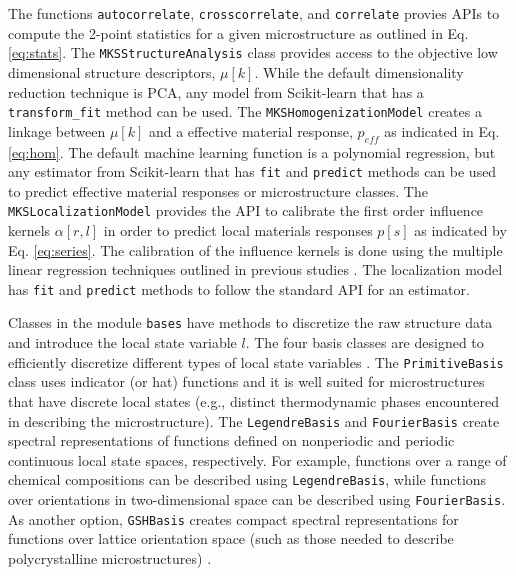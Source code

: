 \documentclass{bmcart}
\begin{document}
The functions \texttt{autocorrelate}, \texttt{crosscorrelate}, and \texttt{correlate} provies APIs to compute the 2-point statistics for a given microstructure as outlined in Eq. \ref{eq:stats}. The \texttt{MKSStructureAnalysis} class provides access to the objective low dimensional structure descriptors, $\mu[k]$. While the default dimensionality reduction technique is PCA, any model from Scikit-learn that has a \texttt{transform\_fit} method can be used. The \texttt{MKSHomogenizationModel} creates a linkage between $\mu[k]$ and a effective material response, $p_{eff}$ as indicated in Eq. \ref{eq:hom}. The default machine learning function is a polynomial regression, but any estimator from Scikit-learn that has \texttt{fit} and \texttt{predict} methods can be used to predict effective material responses or microstructure classes. The \texttt{MKSLocalizationModel} provides the API to calibrate the first order influence kernels $\alpha[r, l]$ in order to predict local materials responses $p[s]$ as indicated by Eq. \ref{eq:series}. The calibration of the influence kernels is done using the multiple linear regression techniques outlined in previous studies \cite{landi2010multi, kalidindi2010novel, yabansu2014calibrated, brough2016microstructure}. The localization model has \texttt{fit} and \texttt{predict} methods to follow the standard API for an estimator.

Classes in the module \texttt{bases} have methods to discretize the raw structure data and introduce the local state variable $l$. The four basis classes are designed to efficiently discretize different types of local state variables \cite{landi2010multi, kalidindi2010novel, yabansu2014calibrated, al2012multi, kalidindi2011microstructure, gupta2015structure,  cceccen2014data, brough2016microstructure}. The \texttt{PrimitiveBasis} class uses indicator (or hat) functions and it is well suited for microstructures that have discrete local states (e.g., distinct thermodynamic phases encountered in describing the microstructure). The \texttt{LegendreBasis} and \texttt{FourierBasis} create spectral representations of functions defined on nonperiodic and periodic continuous local state spaces, respectively. For example, functions over a range of chemical compositions can be described using \texttt{LegendreBasis}, while functions over orientations in two-dimensional space can be described using \texttt{FourierBasis}. As another option, \texttt{GSHBasis} creates compact spectral representations for functions over lattice orientation space (such as those needed to describe polycrystalline microstructures) \cite{ kalidindi2006spectral, shaffer2010building, knezevic2010deformation, al2010spectral, duvvuru2007application, li2003evolution, li2005texture, li2007processing, li2005processing, creuziger2014crystallographic, sundararaghavan2008multi, sundararaghavan2007linear}.
\end{document}
